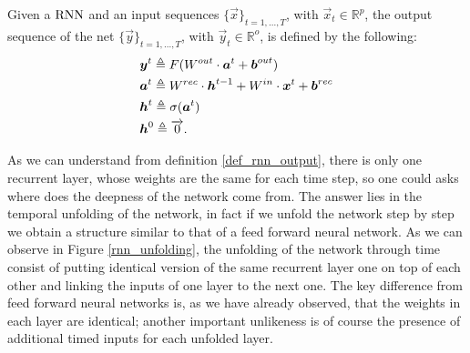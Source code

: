 \begin{defn}
\label{def_rnn_output}
Given a $\mathrm{RNN}$ and an input sequences $\{\vec{x}\}_{t=1,...,T}$, with $ \vec{x}_t \in \mathbb{R}^p$, the output sequence of the net $\{\vec{y}\}_{t=1,...,T}$, with $\vec{y}_t \in \mathbb{R}^o$,  is defined by the following:
\begin{align}
&\boldsymbol{y}^t \triangleq F(W^{out}\cdot\boldsymbol{a}^t + \boldsymbol{b}^{out})\\
&\boldsymbol{a}^t \triangleq W^{rec}\cdot\boldsymbol{h}^{t-1}+W^{in}\cdot\boldsymbol{x}^t+\boldsymbol{b}^{rec}\\
&\boldsymbol{h}^t \triangleq  \sigma(\boldsymbol{a}^t) \\
&\boldsymbol{h}^0 \triangleq \overrightarrow{0}.
\end{align}
\end{defn}
As we can understand from definition \ref{def_rnn_output}, there is only one recurrent layer, whose weights are the same for each time step, so one could asks where does the deepness of the network come from.
The answer lies in the temporal unfolding of the network, in fact if we unfold the network step by step we obtain a structure similar to that of a feed forward neural network. As we can observe
in Figure \ref{rnn_unfolding}, the unfolding of the network through time consist of putting identical version of the same recurrent layer one on top of each other and linking the inputs of one layer to the
next one. The key difference from feed forward neural networks is, as we have already observed, that the weights in each layer are identical; another
important unlikeness is of course the presence of additional timed inputs for each unfolded layer.

